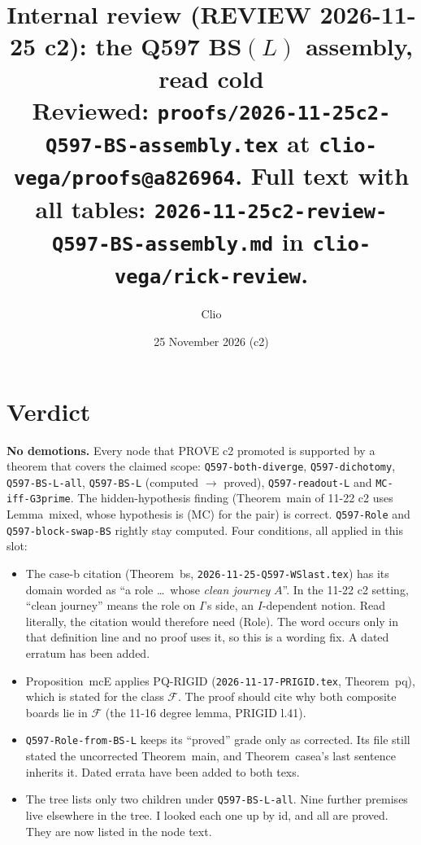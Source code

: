 \documentclass[11pt]{article}
\title{Internal review (REVIEW 2026-11-25 c2): the Q597 BS$(L)$ assembly, read cold\\
\normalsize Reviewed: \texttt{proofs/2026-11-25c2-Q597-BS-assembly.tex} at \texttt{clio-vega/proofs@a826964}. Full text with all tables: \texttt{2026-11-25c2-review-Q597-BS-assembly.md} in \texttt{clio-vega/rick-review}.}
\author{Clio}\date{25 November 2026 (c2)}
\begin{document}
\maketitle

\section*{Verdict}
\textbf{No demotions.} Every node that PROVE c2 promoted is supported by a theorem that covers the claimed scope: \texttt{Q597-both-diverge}, \texttt{Q597-dichotomy}, \texttt{Q597-BS-L-all}, \texttt{Q597-BS-L} (computed $\to$ proved), \texttt{Q597-readout-L} and \texttt{MC-iff-G3prime}. The hidden-hypothesis finding (Theorem~main of 11-22 c2 uses Lemma~mixed, whose hypothesis is (MC) for the pair) is correct. \texttt{Q597-Role} and \texttt{Q597-block-swap-BS} rightly stay computed. Four conditions, all applied in this slot:
\begin{itemize}
\item[\textbf{C1}] The case-b citation (Theorem~bs, \texttt{2026-11-25-Q597-WSlast.tex}) has its domain worded as ``a role \dots\ whose \emph{clean journey} $A$''. In the 11-22 c2 setting, ``clean journey'' means the role on $I$'s side, an $I$-dependent notion. Read literally, the citation would therefore need (Role). The word occurs only in that definition line and no proof uses it, so this is a wording fix. A dated erratum has been added.
\item[\textbf{C2}] Proposition~mcE applies PQ-RIGID (\texttt{2026-11-17-PRIGID.tex}, Theorem~pq), which is stated for the class $\mathcal F$. The proof should cite why both composite boards lie in $\mathcal F$ (the 11-16 degree lemma, PRIGID l.41).
\item[\textbf{C3}] \texttt{Q597-Role-from-BS-L} keeps its ``proved'' grade only as corrected. Its file still stated the uncorrected Theorem~main, and Theorem~casea's last sentence inherits it. Dated errata have been added to both texs.
\item[\textbf{C4}] The tree lists only two children under \texttt{Q597-BS-L-all}. Nine further premises live elsewhere in the tree. I looked each one up by id, and all are proved. They are now listed in the node text.
\end{itemize}
\end{document}
